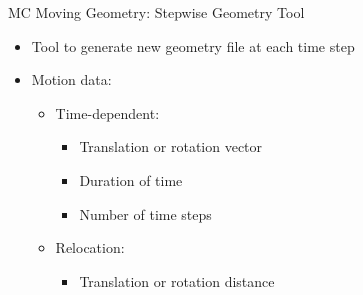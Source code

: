 \documentclass{beamer}
\begin{document}
\begin{frame}{MC Moving Geometry: Stepwise Geometry Tool}
\begin{itemize}
\item{Tool to generate new geometry file at each time step}
\item{Motion data:}
	\begin{itemize}
		\item{Time-dependent:}
			\begin{itemize}
				\item{Translation or rotation vector}
				\item{Duration of time}
				\item{Number of time steps}
			\end{itemize}
		\item{Relocation:}
			\begin{itemize}
		        	\item{Translation or rotation distance}
			\end{itemize}

	\end{itemize}
\end{itemize}
	\centering

\end{frame}

%
\end{document}
